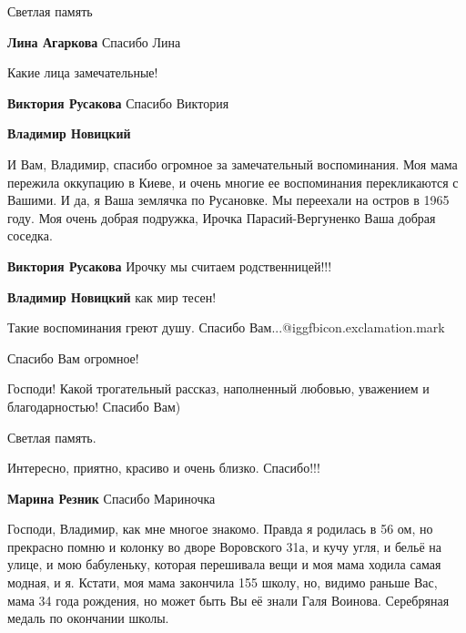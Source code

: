  
 
 
 
 
\zzSecCmt

\begin{itemize} %
Светлая память

\textbf{Лина Агаркова} Спасибо Лина

Какие лица замечательные!

\begin{itemize} %
\textbf{Виктория Русакова} Спасибо Виктория

\textbf{Владимир Новицкий} 

И Вам, Владимир, спасибо огромное за замечательный воспоминания. Моя мама
пережила оккупацию в Киеве, и очень многие ее воспоминания перекликаются с
Вашими. И да, я Ваша землячка по Русановке. Мы переехали на остров в 1965 году.
Моя очень добрая подружка, Ирочка Парасий-Вергуненко Ваша добрая соседка.


\textbf{Виктория Русакова} Ирочку мы считаем родственницей!!!

\textbf{Владимир Новицкий} как мир тесен!
\end{itemize} %

Такие воспоминания греют душу. Спасибо Вам...@igg{fbicon.exclamation.mark}

Спасибо Вам огромное!

Господи! Какой трогательный рассказ, наполненный любовью, уважением и благодарностью! Спасибо Вам)

Светлая память.

Интересно, приятно, красиво и очень близко.
Спасибо!!!

\textbf{Марина Резник} Спасибо Мариночка


Господи, Владимир, как мне многое знакомо. Правда я родилась в 56 ом, но
прекрасно помню и колонку во дворе Воровского 31а, и кучу угля, и бельё на
улице, и мою бабуленьку, которая перешивала вещи и моя мама ходила самая
модная, и я. Кстати, моя мама закончила 155 школу, но, видимо раньше Вас,
мама 34 года рождения, но может быть Вы её знали Галя Воинова. Серебряная
медаль по окончании школы.


\end{itemize}
